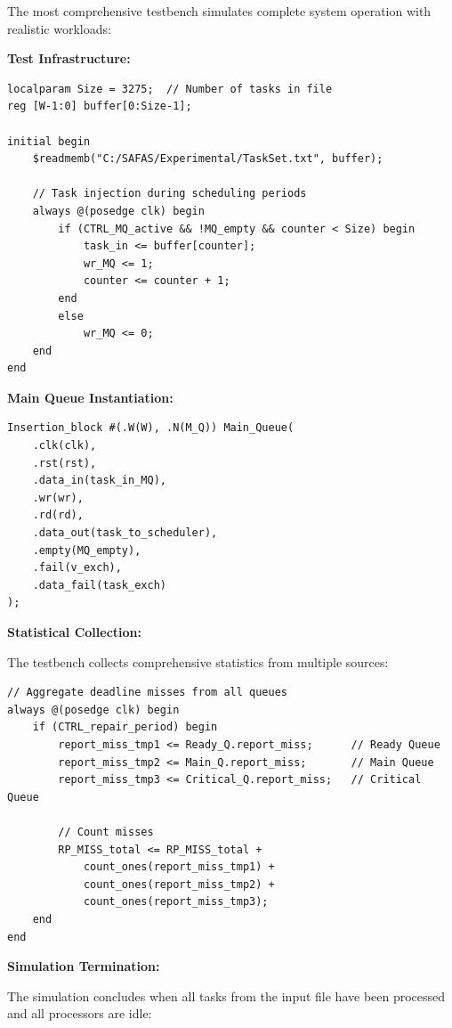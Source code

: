\documentclass[12pt,a4paper]{article}
\begin{document}
The most comprehensive testbench simulates complete system operation with realistic workloads:

\textbf{Test Infrastructure:}

\begin{lstlisting}[style=verilog, caption={Main Testbench File I/O}]
localparam Size = 3275;  // Number of tasks in file
reg [W-1:0] buffer[0:Size-1];

initial begin
    $readmemb("C:/SAFAS/Experimental/TaskSet.txt", buffer);

    // Task injection during scheduling periods
    always @(posedge clk) begin
        if (CTRL_MQ_active && !MQ_empty && counter < Size) begin
            task_in <= buffer[counter];
            wr_MQ <= 1;
            counter <= counter + 1;
        end
        else
            wr_MQ <= 0;
    end
end
\end{lstlisting}

\textbf{Main Queue Instantiation:}

\begin{lstlisting}[style=verilog, caption={Main Queue (512 cells)}]
Insertion_block #(.W(W), .N(M_Q)) Main_Queue(
    .clk(clk),
    .rst(rst),
    .data_in(task_in_MQ),
    .wr(wr),
    .rd(rd),
    .data_out(task_to_scheduler),
    .empty(MQ_empty),
    .fail(v_exch),
    .data_fail(task_exch)
);
\end{lstlisting}

\textbf{Statistical Collection:}

The testbench collects comprehensive statistics from multiple sources:

\begin{lstlisting}[style=verilog, caption={Statistical Monitoring}]
// Aggregate deadline misses from all queues
always @(posedge clk) begin
    if (CTRL_repair_period) begin
        report_miss_tmp1 <= Ready_Q.report_miss;      // Ready Queue
        report_miss_tmp2 <= Main_Q.report_miss;       // Main Queue
        report_miss_tmp3 <= Critical_Q.report_miss;   // Critical Queue

        // Count misses
        RP_MISS_total <= RP_MISS_total +
            count_ones(report_miss_tmp1) +
            count_ones(report_miss_tmp2) +
            count_ones(report_miss_tmp3);
    end
end
\end{lstlisting}

\textbf{Simulation Termination:}

The simulation concludes when all tasks from the input file have been processed and all processors are idle:
\end{document}
